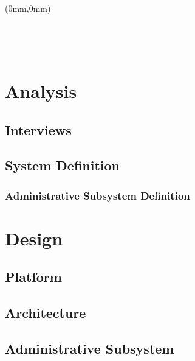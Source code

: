 


	\begin{titlepage}
	\begin{textblock*}{297mm}(0mm,0mm)
		 \hspace{-6.5mm}

		

	\end{textblock*}
	\thispagestyle{empty}

\ \pagebreak{} 
	\end{titlepage}
\ \thispagestyle{empty} \ \pagebreak{}



\tableofcontents
\cleardoublepage
	
\newpage
\thispagestyle{empty}
\begin{titlepage}
\end{titlepage}
	
	\chapter{Analysis}
		\section{Interviews}
		\section{System Definition}
			\subsection{Administrative Subsystem Definition}

	\chapter{Design}
		\section{Platform}
		\section{Architecture}
		\section{Administrative Subsystem}
